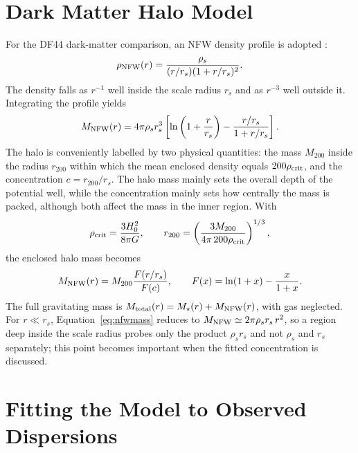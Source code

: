 \documentclass[12pt,a4paper]{report}
\numberwithin{equation}{chapter}
\begin{document}
\section{Dark Matter Halo Model}

For the DF44 dark-matter comparison, an NFW density profile is adopted \cite{navarro1997}:
\begin{equation}
 \rho_{\rm NFW}(r)=\frac{\rho_s}{(r/r_s)(1+r/r_s)^2}.
 \label{eq:nfwrho}
\end{equation}
The density falls as $r^{-1}$ well inside the scale radius $r_s$ and as $r^{-3}$ well outside it. Integrating the profile yields
\begin{equation}
 M_{\rm NFW}(r)=4\pi\rho_s r_s^3
 \left[\ln\left(1+\frac{r}{r_s}\right)-\frac{r/r_s}{1+r/r_s}\right].
 \label{eq:nfwmass}
\end{equation}
The halo is conveniently labelled by two physical quantities: the mass $M_{200}$ inside the radius $r_{200}$ within which the mean enclosed density equals $200\rho_{\rm crit}$, and the concentration $c=r_{200}/r_s$. The halo mass mainly sets the overall depth of the potential well, while the concentration mainly sets how centrally the mass is packed, although both affect the mass in the inner region. With
\begin{equation}
 \rho_{\rm crit}=\frac{3H_0^2}{8\pi G},\qquad
 r_{200}=\left(\frac{3M_{200}}{4\pi\,200\rho_{\rm crit}}\right)^{1/3},
 \label{eq:r200}
\end{equation}
the enclosed halo mass becomes
\begin{equation}
 M_{\rm NFW}(r)=M_{200}\frac{F(r/r_s)}{F(c)},\qquad
 F(x)=\ln(1+x)-\frac{x}{1+x}.
 \label{eq:nfwmassnormalized}
\end{equation}
The full gravitating mass is $M_{\rm total}(r)=M_\star(r)+M_{\rm NFW}(r)$, with gas neglected. For $r\ll r_s$, Equation~\eqref{eq:nfwmass} reduces to $M_{\rm NFW}\simeq2\pi\rho_s r_s\,r^2$, so a region deep inside the scale radius probes only the product $\rho_s r_s$ and not $\rho_s$ and $r_s$ separately; this point becomes important when the fitted concentration is discussed.

\section{Fitting the Model to Observed Dispersions}
\end{document}
